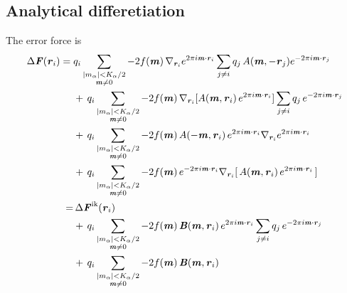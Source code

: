 \documentclass[aps,pre,preprint]{revtex4-1}
\renewcommand{\v}[1]{\textbf{\textit{#1}}}
\begin{document}
\subsection{Analytical differetiation}

The error force is 
\begin{align}\nonumber
  \Delta\v F(\v r_i)
  =\;&
  q_i
  \sum_{
    \begin{subarray}{c}
      \vert m_{\alpha}\vert < K_\alpha/2\\
      \v m\neq 0
    \end{subarray}}
  -2f(\v m)\,
  \nabla_{\v r_i}
  e^{2\pi i\v m\cdot \v r_i}
  \sum_{j\neq i}q_j\,
  A(\v m, -\v r_j)
  e^{-2\pi i\v m\cdot\v r_j} \\\nonumber
  & +\,
  q_i
  \sum_{
    \begin{subarray}{c}
      \vert m_{\alpha}\vert < K_\alpha/2\\
      \v m\neq 0
    \end{subarray}}
  -2f(\v m)\,
  \nabla_{\v r_i}
  [A(\v m, \v r_i)\,
  e^{2\pi i\v m\cdot \v r_i} ]
  \sum_{j\neq i}q_j\,
  e^{-2\pi i\v m\cdot\v r_j} \\\nonumber
  & +\,
  q_i
  \sum_{
    \begin{subarray}{c}
      \vert m_{\alpha}\vert < K_\alpha/2\\
      \v m\neq 0
    \end{subarray}}
  -2f(\v m)\,
  A(-\v m, \v r_i)\,e^{2\pi i\v m\cdot \v r_i} \nabla_{\v r_i}e^{2\pi i\v m\cdot\v r_i} \\
  & +\,
  q_i
  \sum_{
    \begin{subarray}{c}
      \vert m_{\alpha}\vert < K_\alpha/2\\
      \v m\neq 0
    \end{subarray}}
  -2f(\v m)\,
  e^{-2\pi i\v m\cdot \v r_i}
  \nabla_{\v r_i} [\,A(\v m, \v r_i) \,e^{2\pi i\v m\cdot\v r_i}\,]  \\\nonumber
  =&\,
  \Delta\v F^{\textrm{ik}}(\v r_i)\\\nonumber
  & +\,
  q_i
  \sum_{
    \begin{subarray}{c}
      \vert m_{\alpha}\vert < K_\alpha/2\\
      \v m\neq 0
    \end{subarray}}
  -2f(\v m)\,
  \v B(\v m, \v r_i)\,e^{2\pi i\v m\cdot \v r_i}
  \sum_{j\neq i}q_j\,
  e^{-2\pi i\v m\cdot\v r_j} \\
  & +\,
  q_i
  \sum_{
    \begin{subarray}{c}
      \vert m_{\alpha}\vert < K_\alpha/2\\
      \v m\neq 0
    \end{subarray}}
  -2f(\v m)\,\v B(\v m, \v r_i) 
\end{align}
\end{document}
